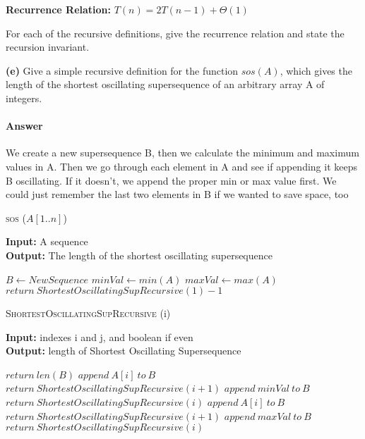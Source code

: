 \documentclass{article}
\begin{document}
{\bf Recurrence Relation: } $T(n) = 2T(n-1) + \Theta(1)$

\todo{}



For each of the recursive definitions, give the recurrence
relation and state the recursion invariant.

{\bf (e)} Give a simple recursive definition for the function $sos(A)$, which gives
the length of the shortest oscillating supersequence of an arbitrary array
A of integers.

\paragraph{Answer}

We create a new supersequence B, then we calculate the minimum and maximum values in A.
Then we go through each element in A and see if appending it keeps B oscillating. If it
doesn't, we append the proper min or max value first. We could just remember the last two
elements in B if we wanted to save space, too

\begin{algorithm} \caption{\textsc{sos} ($A[1..n]$)}\label{alg:seb}
    {\bf Input:} A sequence\\
    {\bf Output:} The length of the shortest oscillating supersequence
    \begin{algorithmic}[1]
        \State$B \gets NewSequence$
        \State$minVal \gets min(A)$
        \State$maxVal \gets max(A)$
        \State$return\ ShortestOscillatingSupRecursive(1) -1$
    \end{algorithmic}
\end{algorithm}

\begin{algorithm} \caption{\textsc{ShortestOscillatingSupRecursive} (i)}\label{alg:seb}
    {\bf Input:} indexes i and j, and boolean if even\\
    {\bf Output:} length of Shortest Oscillating Supersequence
    \begin{algorithmic}[1]
            \State$return\ len(B)$
        \Else{}
                    \State$append\ A[i]\ to\ B$
                    \State$return\ ShortestOscillatingSupRecursive(i+1)$
                \Else{}
                    \State$append\ minVal\ to\ B$
                    \State$return\ ShortestOscillatingSupRecursive(i)$
                \EndIf{}
            \Else{}
                    \State$append\ A[i]\ to\ B$
                    \State$return\ ShortestOscillatingSupRecursive(i+1)$
                \Else{}
                    \State$append\ maxVal\ to\ B$
                    \State$return\ ShortestOscillatingSupRecursive(i)$
                \EndIf{}
            \EndIf{}
        \EndIf{}
    \end{algorithmic}
\end{algorithm}
\end{document}
